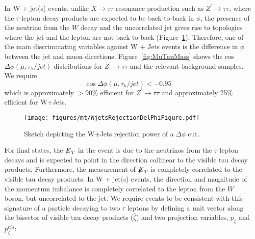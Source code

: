 In W + jet(s) events, unlike $X\rightarrow\tau\tau$ resonance production such as $Z^{\prime} \to \tau\tau$, where the $\tau$-lepton decay products are expected to 
be back-to-back in $\phi$, the presence of the neutrino from the $W$ decay and the uncorrelated jet gives rise to topologies where the jet and the lepton are not 
back-to-back (Figure~\ref{fig:WjetsRejectionDelPhiFigure}). Therefore, one of the main 
discriminating variables against W + Jets events is the difference in $\phi$ between the jet and muon directions. 
Figure~\ref{fig:MuTauMass} shows the cos$\Delta \phi(\mu,\tau_{h}/jet)$ distributions for $Z^\prime\to\tau\tau$ and the relevant background samples. 
We require 
\begin{equation}
\cos\Delta\phi(\mu,\tau_{h}/jet) < -0.95
\end{equation}
\noindent which is approximately $> 90$\% efficient for $Z^{\prime} \to \tau\tau$ and approximately 25\% efficient for W+Jets.

\begin{figure}
\begin{center}
\texttt{[image: figures/mt/WjetsRejectionDelPhiFigure.pdf]}
\caption{ Sketch depicting the W+Jets rejection power of a $\Delta \phi$ cut.}
\label{fig:WjetsRejectionDelPhiFigure}
\end{center}
\end{figure}

For \ditau final states, the ${\not\mathrel{E}}_T$ in the event is due to the neutrinos from the $\tau$-lepton decays and is expected to point in the direction collinear 
to the visible tau decay products. Furthermore, the measurement of ${\not\mathrel{E}}_T$ is completely correlated to the visible tau decay products. In W + jet(s) 
events, the direction and magnitude of the momentum imbalance is completely correlated to the lepton from the $W$ boson, but 
uncorrelated to the jet. We require events to be consistent with this signature of a particle decaying to two $\tau$ leptons by defining a unit vector along the 
bisector of visible tau decay products ($\hat{\zeta}$) and two projection variables, $p_{\zeta}$ and $p_{\zeta}^{vis}$:

